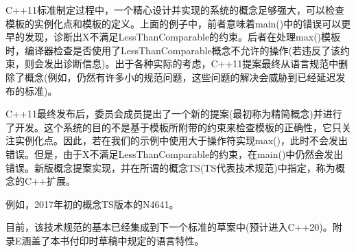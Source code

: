 C++11标准制定过程中，一个精心设计并实现的系统的概念足够强大，可以检查模板的实例化点和模板的定义。上面的例子中，前者意味着main()中的错误可以更早的发现，诊断出X不满足LessThanComparable的约束。后者在处理max()模板时，编译器检查是否使用了LessThanComparable概念不允许的操作(若违反了该约束，则会发出诊断信息)。出于各种实际的考虑，C++11提案最终从语言规范中删除了概念(例如，仍然有许多小的规范问题，这些问题的解决会威胁到已经延迟发布的标准)。

C++11最终发布后，委员会成员提出了一个新的提案(最初称为精简概念)并进行了开发。这个系统的目的不是基于模板所附带的约束来检查模板的正确性，它只关注实例化点。因此，若在我们的示例中使用大于操作符实现max()，此时不会发出错误。但是，由于X不满足LessThanComparable的约束，在main()中仍然会发出错误。新版概念提案实现，并在所谓的概念TS(TS代表技术规范)中指定，称为概念的C++扩展。

\begin{tcolorbox}[colback=webgreen!5!white,colframe=webgreen!75!black]
\hspace*{0.75cm}例如，2017年初的概念TS版本的N4641。
\end{tcolorbox}

目前，该技术规范的基本已经集成到下一个标准的草案中(预计进入C++20)。附录E涵盖了本书付印时草稿中规定的语言特性。














































